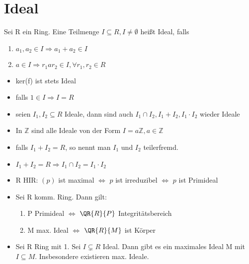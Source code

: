 \section{Ideal}
\begin{definition}
Sei R ein Ring. Eine Teilmenge $I \subseteq R, I \neq \emptyset$ heißt Ideal, falls
\begin{enumerate}
	\item $a_1,a_2 \in I \Rightarrow a_1+a_2 \in I$
	\item $a \in I \Rightarrow r_1 a r_2 \in I, \forall r_1,r_2 \in R$
\end{enumerate}
\end{definition}
\begin{remark}
\begin{itemize}
\leavevmode
	\item ker(f) ist stets Ideal
	\item falls $1 \in I \Rightarrow I = R$
	\item seien $I_1,I_2 \subseteq R$ Ideale, dann sind auch $I_1 \cap I_2, I_1+I_2, I_1 \cdot I_2$ wieder Ideale
	\item In $\mathbb{Z}$ sind alle Ideale von der Form $I=a\mathbb{Z}, a \in \mathbb{Z}$
	\item falls $I_1+I_2 = R$, so nennt man $I_1$ und $I_2$ teilerfremd.
	\item $I_1+I_2 = R \Rightarrow I_1 \cap I_2 = I_1 \cdot I_2$
	\item R HIR: $(p)$ ist maximal $ \Leftrightarrow $ $p$ ist irreduzibel $\Leftrightarrow$ $p$ ist Primideal
	\item Sei R komm. Ring. Dann gilt:
	\begin{enumerate}
		\item P Primideal $\Leftrightarrow$ $\QR{R}{P}$ Integritätsbereich
		\item M max. Ideal $\Leftrightarrow$ $\QR{R}{M}$ ist Körper
	\end{enumerate}
	\item Sei R Ring mit 1. Sei $I \subsetneq R $ Ideal. Dann gibt es ein maximales Ideal M mit $ I \subseteq M$. Insbesondere existieren max. Ideale.
\end{itemize}
\end{remark}
